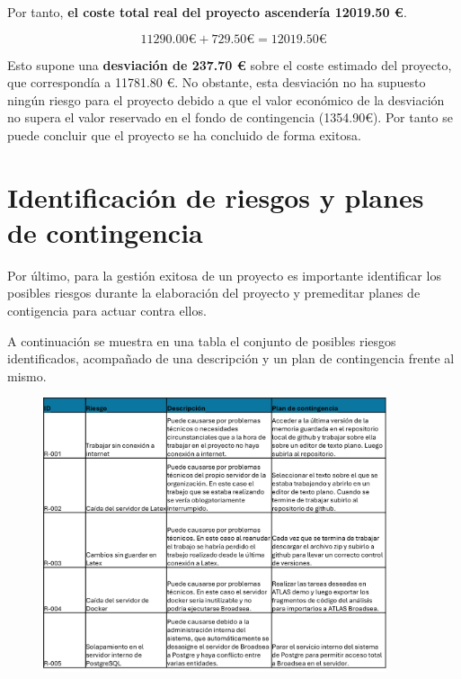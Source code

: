 Por tanto,\textbf{ el coste total real del proyecto ascendería  12019.50 €}.

\begin{equation}
    11290.00\text{€} + 729.50\text{€} =  12019.50 \text{€}
\end{equation}

Esto supone una\textbf{ desviación de 237.70 €} sobre el coste estimado del proyecto, que correspondía a 11781.80 €. No obstante, esta desviación no ha supuesto ningún riesgo para el proyecto debido a que el valor económico de la desviación no supera el valor reservado en el fondo de contingencia (1354.90€). Por tanto se puede concluir que el proyecto se ha concluido de forma exitosa. 

\section{Identificación de riesgos y planes de contingencia} \label{sec:03Riesgos}

Por último, para la gestión exitosa de un proyecto es importante identificar los posibles riesgos durante la elaboración del proyecto y premeditar planes de contigencia para actuar contra ellos. 

A continuación se muestra en una tabla el conjunto de posibles riesgos identificados, acompañado de una descripción y un plan de contingencia frente al mismo.

\begin{figure}[H]
    \centering
    \includegraphics[width=0.90\textwidth]{tables/tablaRiesgos.jpg}
    \label{table:tablaRiesgos}
\end{figure}

